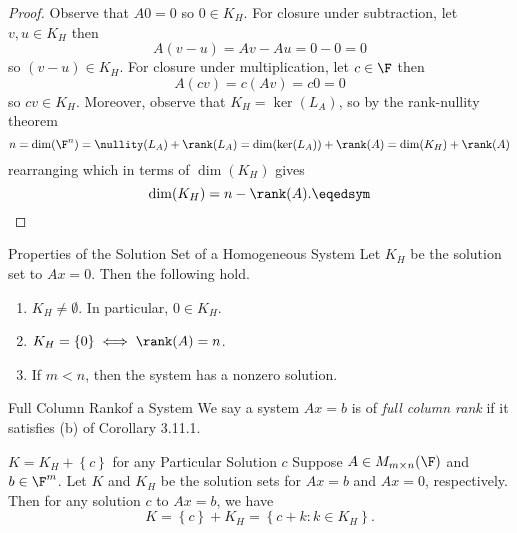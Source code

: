 \documentclass[linearalgebra]{subfiles}
\begin{document}
    \begin{proof}
        Observe that $A0 = 0$ so $0\in K_H$. For closure under subtraction, let $v, u\in K_H$ then
        \begin{equation*}
            A(v-u) = Av-Au = 0-0 = 0
        \end{equation*}
        so $(v-u)\in K_H$. For closure under multiplication, let $c\in \F$ then
        \begin{equation*}
            A(cv) = c(Av) = c0 = 0
        \end{equation*}
        so $cv\in K_H$. Moreover, observe that $K_H = \ker(L_A)$, so by the rank-nullity theorem
        \begin{equation*}
            n = \dim(\F^n) = \nullity (L_A) + \rank (L_A) = \dim (\ker(L_A)) + \rank(A) = \dim(K_H) + \rank(A)
        \end{equation*}
        rearranging which in terms of $\dim(K_H)$ gives
        \begin{equation*}
            \dim(K_H) = n - \rank(A). \eqedsym
        \end{equation*}
    \end{proof}

    \clearpage
    \begin{cor}{Properties of the Solution Set of a Homogeneous System}
        Let $K_H$ be the solution set to $Ax=0$. Then the following hold.
        \begin{enumerate}
            \item $K_H\neq \emptyset$. In particular, $0\in K_H$.
            \item $K_H = \left\lbrace 0 \right\rbrace \iff \rank(A) = n$.
            \item If $m<n$, then the system has a nonzero solution.
        \end{enumerate}
    \end{cor}	

    \begin{definition}{Full Column Rank}{of a System}
            We say a system $Ax=b$ is of \emph{full column rank} if it satisfies (b) of Corollary 3.11.1. 
    \end{definition}

    \begin{prop}{$K=K_H + \left\lbrace c \right\rbrace$ for any Particular Solution $c$}
        Suppose $A\in M_{m\times n}(\F)$ and $b\in \F^m$. Let $K$ and $K_H$ be the solution sets for $Ax=b$ and $Ax=0$, respectively. Then for any solution $c$ to $Ax=b$, we have
        \begin{equation*}
            K = \left\lbrace c \right\rbrace + K_H = \left\lbrace c+k: k\in K_H \right\rbrace.
        \end{equation*}
    \end{prop}
\end{document}
